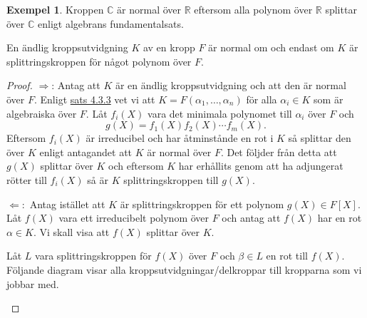 \documentclass{article}
\theoremstyle{definition}
\newtheorem{exmp}[thm]{Exempel}
\begin{document}
\begin{exmp}
  Kroppen $\mathbb{C}$ är normal över $\mathbb{R}$ eftersom alla polynom över $\mathbb{R}$ splittar över $\mathbb{C}$ enligt 
  algebrans fundamentalsats. 
\end{exmp}

\hypertarget{sats6.3.1}{}
\begin{mytheo}{}{}
  En ändlig kroppsutvidgning $K$ av en kropp $F$ är normal om och endast om $K$ är splittringskroppen för något polynom över $F.$
\end{mytheo}
\begin{proof}
  $\Rightarrow$: Antag att $K$ är en ändlig kroppsutvidgning och att den är normal över $F$. Enligt \hyperlink{sats5.3.3}{sats 4.3.3}
  vet vi att $K = F(\alpha_1, \ldots, \alpha_n)$ för alla $\alpha_i \in K$ som är algebraiska över $F.$ Låt $f_i(X)$ vara det minimala polynomet 
  till $\alpha_i$ över $F$ och 
  \[g(X) = f_1(X) f_2(X) \cdots f_m(X).\] 
  Eftersom $f_i(X)$ är irreducibel och har åtminstånde en rot i $K$ så splittar den över $K$ enligt antagandet att $K$ är normal över $F$. Det följder från detta 
  att $g(X)$ splittar över $K$ och eftersom $K$ har erhållits genom att ha adjungerat rötter till $f_i(X)$ så är $K$ splittringskroppen till $g(X).$

  $\Leftarrow:$ Antag istället att $K$ är splittringskroppen för ett polynom $g(X) \in F[X]$. Låt $f(X)$ vara ett irreducibelt polynom över $F$ och antag 
  att $f(X)$ har en rot $\alpha \in K$. Vi skall visa att $f(X)$ splittar över $K$.
  
  Låt $L$ vara splittringskroppen för $f(X)$ över $F$ och $\beta \in L$ en rot till $f(X)$. Följande diagram visar alla kroppsutvidgningar/delkroppar 
  till kropparna som vi jobbar med. 


  \begin{center}
    \newcommand{\mydistance}{.6cm}
\end{center}
\end{proof}
\end{document}
